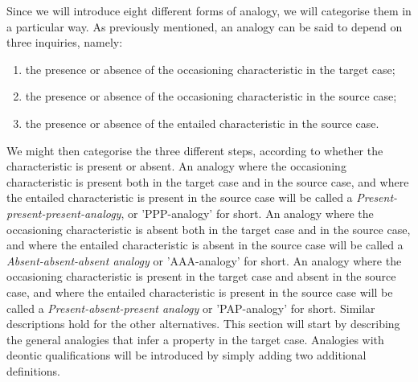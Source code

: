 		Since we will introduce eight different forms of analogy, we will categorise them in a particular way. As previously mentioned, an analogy can be said to depend on three inquiries, namely: 
			\begin{enumerate}
				\item the presence or absence of the occasioning characteristic in the target case;
				\item the presence or absence of the occasioning characteristic in the source case;
				\item the presence or absence of the entailed characteristic in the source case.
			\end{enumerate}
		
		We might then categorise the three different steps, according to whether the characteristic is present or absent. An analogy where the occasioning characteristic is present both in the target case and in the source case, and where the entailed characteristic is present in the source case will be called a \textit{Present-present-present-analogy}, or 'PPP-analogy' for short. An analogy where the occasioning characteristic is absent both in the target case and in the source case, and where the entailed characteristic is absent in the source case will be called a \textit{Absent-absent-absent analogy} or 'AAA-analogy' for short. An analogy where the occasioning characteristic is present in the target case and absent in the source case, and where the entailed characteristic is present in the source case will be called a \textit{Present-absent-present analogy} or 'PAP-analogy' for short. Similar descriptions hold for the other alternatives. This section will start by describing the general analogies that infer a property in the target case. Analogies with deontic qualifications will be introduced by simply adding two additional definitions.
		
